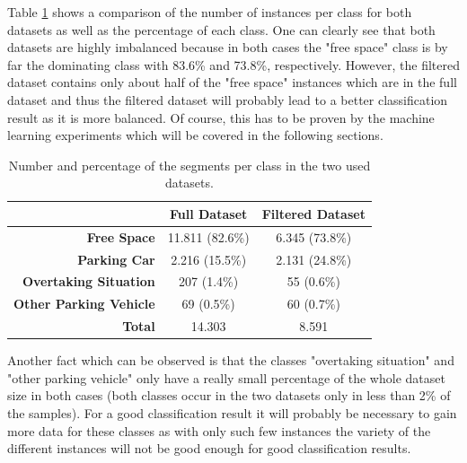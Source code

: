 Table \ref{table:dataset_comparison} shows a comparison of the number of instances per class for both datasets as well as the percentage of each class. One can clearly see that both datasets are highly imbalanced because in both cases the "free space" class is by far the dominating class with 83.6\% and 73.8\%, respectively. However, the filtered dataset contains only about half of the "free space" instances which are in the full dataset and thus the filtered dataset will probably lead to a better classification result as it is more balanced. Of course, this has to be proven by the machine learning experiments which will be covered in the following sections.

\begin{table}

\centering
\bgroup
\def\arraystretch{1.4}
\begin{tabular}{| r || c | c |}
\hline
   & 
   \textbf{Full Dataset} & 
   \textbf{Filtered Dataset} \\
\hline
   \textbf{Free Space} & 
   11.811 (82.6\%) & 
   6.345 (73.8\%) \\
\hline
   \textbf{Parking Car} & 
   2.216 (15.5\%) & 
   2.131 (24.8\%) \\
\hline
   \textbf{Overtaking Situation} & 
   207 (1.4\%) & 
   55 (0.6\%) \\
\hline
   \textbf{Other Parking Vehicle}& 
   69 (0.5\%) & 
   60 (0.7\%) \\
\hline
\hline
   \textbf{Total}& 
   14.303 & 
   8.591 \\
\hline

\end{tabular}
\egroup

\caption{Number and percentage of the segments per class in the two used datasets.}
\label{table:dataset_comparison}
\end{table}

Another fact which can be observed is that the classes "overtaking situation" and "other parking vehicle" only have a really small percentage of the whole dataset size in both cases (both classes occur in the two datasets only in less than 2\% of the samples). For a good classification result it will probably be necessary to gain more data for these classes as with only such few instances the variety of the different instances will not be good enough for good classification results.
 




